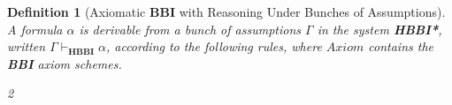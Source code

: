 \documentclass[a4paper]{article}
\newtheorem{definition}[theorem]{Definition}
\newcommand\magicwand{\mathrel{-\mkern-6mu*}}
\newcommand{\BBI}{\textbf{BBI}\xspace}
\begin{document}
\begin{definition}[Axiomatic \BBI with Reasoning Under Bunches of Assumptions]
     A formula $\alpha$ is derivable from a bunch of assumptions $\Gamma$ in the system \textbf{HBBI*}, written $\Gamma \vdash_{\textbf{HBBI}} \alpha$, according to the following rules, where $Axiom$ contains the \BBI axiom schemes.
\begin{enumerate}
\begin{multicols}{2}

\item \AxiomC{}
\UnaryInfC{$\alpha \vdash \alpha$}

\DisplayProof

\vspace{0.5em}
\item \AxiomC{$\Gamma[\Gamma'] \vdash \alpha$}

\DisplayProof

\vspace{0.5em}
\item {}
\UnaryInfC{$\Gamma[\Gamma']\vdash \alpha$}

\DisplayProof



\vspace{0.5em}
\item {}
\UnaryInfC{$\Gamma \vdash \alpha$}

\DisplayProof

\vspace{0.5em}
\item \AxiomC{$\Gamma \vdash \alpha $}
\AxiomC{$\Delta \vdash \alpha \rightarrow \beta$}

\BinaryInfC{$\Gamma; \Delta \vdash \beta$}

\DisplayProof


\item \AxiomC{$ \vdash \alpha \rightarrow \gamma $}
\AxiomC{$ \vdash \beta \rightarrow \delta$}

\BinaryInfC{$\Gamma \vdash (\alpha * \beta) \rightarrow (\gamma * \delta)$}

\DisplayProof

\vspace{0.5em}
\item \AxiomC{$ \Gamma \vdash \alpha \rightarrow (\beta \magicwand \gamma)$}
\UnaryInfC{$\Gamma \vdash (\alpha *\beta) \rightarrow \gamma$}

\DisplayProof


\end{multicols}
\end{enumerate}
\end{definition}
\end{document}
